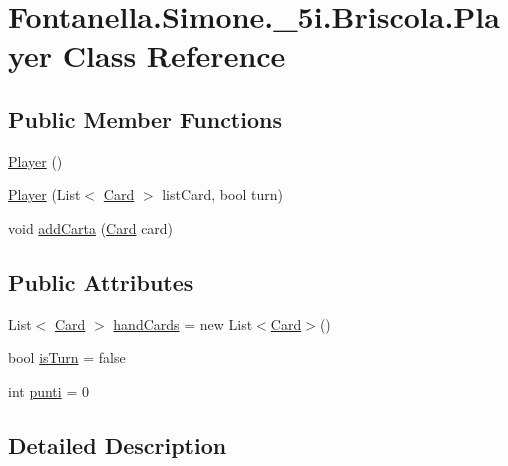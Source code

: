\hypertarget{class_fontanella_1_1_simone_1_1__5i_1_1_briscola_1_1_player}{}\section{Fontanella.\+Simone.\+\_\+5i.\+Briscola.\+Player Class Reference}
\label{class_fontanella_1_1_simone_1_1__5i_1_1_briscola_1_1_player}
\subsection*{Public Member Functions}
\begin{DoxyCompactItemize}
\item 
\hyperlink{class_fontanella_1_1_simone_1_1__5i_1_1_briscola_1_1_player_aa805663430170d74db67e3f900c14715}{Player} ()
\item 
\hyperlink{class_fontanella_1_1_simone_1_1__5i_1_1_briscola_1_1_player_aef3390197ac09b8e799c3144c0a33bb6}{Player} (List$<$ \hyperlink{class_fontanella_1_1_simone_1_1__5i_1_1_briscola_1_1_card}{Card} $>$ list\+Card, bool turn)
\item 
void \hyperlink{class_fontanella_1_1_simone_1_1__5i_1_1_briscola_1_1_player_ac4efbc7a4c7809d9a54cefdba76cf771}{add\+Carta} (\hyperlink{class_fontanella_1_1_simone_1_1__5i_1_1_briscola_1_1_card}{Card} card)
\end{DoxyCompactItemize}
\subsection*{Public Attributes}
\begin{DoxyCompactItemize}
\item 
List$<$ \hyperlink{class_fontanella_1_1_simone_1_1__5i_1_1_briscola_1_1_card}{Card} $>$ \hyperlink{class_fontanella_1_1_simone_1_1__5i_1_1_briscola_1_1_player_aea76897ad4738640a6d4a06c553a4453}{hand\+Cards} = new List$<$\hyperlink{class_fontanella_1_1_simone_1_1__5i_1_1_briscola_1_1_card}{Card}$>$()
\item 
bool \hyperlink{class_fontanella_1_1_simone_1_1__5i_1_1_briscola_1_1_player_ad2b525444ebc7aa1baeff6aee7020ad0}{is\+Turn} = false
\item 
int \hyperlink{class_fontanella_1_1_simone_1_1__5i_1_1_briscola_1_1_player_aa67dff030186e73f9e6ca595db566793}{punti} = 0
\end{DoxyCompactItemize}


\subsection{Detailed Description}


